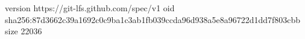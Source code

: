 version https://git-lfs.github.com/spec/v1
oid sha256:87d3662c39a1692c0c9ba1c3ab1fb039ccda96d938a5e8a96722d1dd7f803cbb
size 22036
